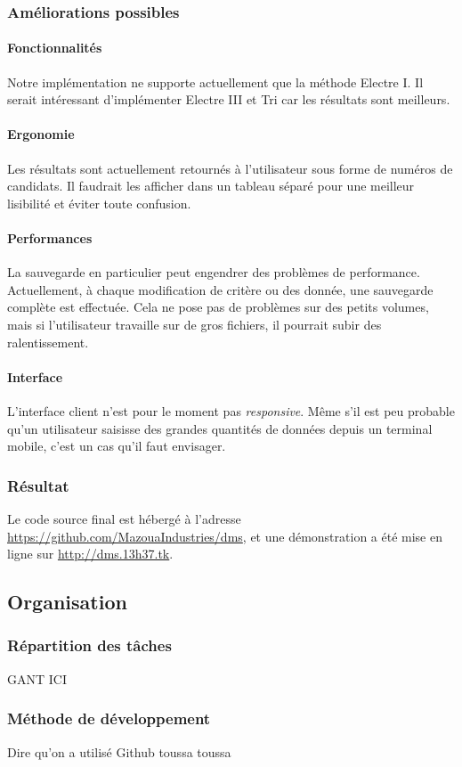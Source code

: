 \documentclass[a4paper]{article}
\begin{document}
\subsubsection{Améliorations possibles}

\paragraph{Fonctionnalités} Notre implémentation ne supporte actuellement que la méthode Electre I. Il serait intéressant d'implémenter Electre III et Tri car les résultats sont meilleurs.

\paragraph{Ergonomie} Les résultats sont actuellement retournés à l'utilisateur sous forme de numéros de candidats. Il faudrait les afficher dans un tableau séparé pour une meilleur lisibilité et éviter toute confusion.

\paragraph{Performances} La sauvegarde en particulier peut engendrer des problèmes de performance. Actuellement, à chaque modification de critère ou des donnée, une sauvegarde complète est effectuée. Cela ne pose pas de problèmes sur des petits volumes, mais si l'utilisateur travaille sur de gros fichiers, il pourrait subir des ralentissement.

\paragraph{Interface} L'interface client n'est pour le moment pas \textit{responsive}. Même s'il est peu probable qu'un utilisateur saisisse des grandes quantités de données depuis un terminal mobile, c'est un cas qu'il faut envisager.

\subsubsection{Résultat}

Le code source final est hébergé à l'adresse \url{https://github.com/MazouaIndustries/dms}, et une démonstration a été mise en ligne sur \url{http://dms.13h37.tk}.

\newpage

\subsection{Organisation}

\subsubsection{Répartition des tâches}

GANT ICI

\subsubsection{Méthode de développement}

Dire qu'on a utilisé Github toussa toussa
\end{document}
